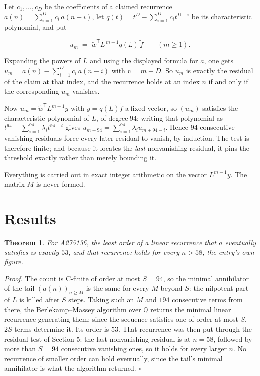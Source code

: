 \documentclass[11pt]{article}
\newtheorem{theorem}{Theorem}
\theoremstyle{definition}
\begin{document}
Let $c_1,\dots,c_D$ be the coefficients of a claimed recurrence $a(n) = \sum_{i=1}^{D} c_i\,a(n-i)$, let $q(t) = t^{D} - \sum_{i=1}^{D} c_i t^{D-i}$ be its characteristic polynomial, and put

\[u_m \;=\; \tilde w^{\mathsf T} L^{\,m-1} q(L)\,\tilde f \qquad (m \ge 1).\]

Expanding the powers of $L$ and using the displayed formula for $a$, one gets $u_m = a(n) - \sum_{i=1}^{D} c_i\,a(n-i)$ with $n = m + D$. So $u_m$ is exactly the residual of the claim at that index, and the recurrence holds at an index $n$ if and only if the corresponding $u_m$ vanishes.

Now $u_m = \tilde w^{\mathsf T} L^{m-1} y$ with $y = q(L)\tilde f$ a fixed vector, so $(u_m)$ satisfies the characteristic polynomial of $L$, of degree $94$: writing that polynomial as $t^{94} - \sum_{i=1}^{94} \lambda_i t^{94-i}$ gives $u_{m+94} = \sum_{i=1}^{94} \lambda_i u_{m+94-i}$. Hence $94$ consecutive vanishing residuals force every later residual to vanish, by induction. The test is therefore finite; and because it locates the {\itshape last} nonvanishing residual, it pins the threshold exactly rather than merely bounding it.

Everything is carried out in exact integer arithmetic on the vector $L^{m-1}y$. The matrix $M$ is never formed.

\section{Results}

\begin{theorem} For A275136, the least order of a linear recurrence that $a$ eventually satisfies is exactly $53$, and that recurrence holds for every $n > 58$, the entry's own figure.\end{theorem}

{\itshape Proof.} The count is C-finite of order at most $S = 94$, so the minimal annihilator of the tail $(a(n))_{n \ge M}$ is the same for every $M$ beyond $S$: the nilpotent part of $L$ is killed after $S$ steps. Taking such an $M$ and $194$ consecutive terms from there, the Berlekamp--Massey algorithm over $\mathbb{Q}$ returns the minimal linear recurrence generating them; since the sequence satisfies one of order at most $S$, $2S$ terms determine it. Its order is $53$. That recurrence was then put through the residual test of Section 5: the last nonvanishing residual is at $n = 58$, followed by more than $S = 94$ consecutive vanishing ones, so it holds for every larger $n$. No recurrence of smaller order can hold eventually, since the tail's minimal annihilator is what the algorithm returned. $\square$
\end{document}
